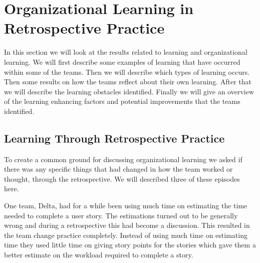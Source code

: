 \begin{table}[!h]
	\begin{center}
	\caption{Value Decreasing Hinders for the Retrospective}
	\label{table:value-decreasing-hinders}
	\end{center}
\end{table}


\clearpage

\section{Organizational Learning in Retrospective Practice}
In this section we will look at the results related to learning and organizational learning. We will first describe some examples of learning that have occurred within some of the teams. Then we will describe which types of learning occurs. Then some results on how the teams reflect about their own learning. After that we will describe the learning obstacles identified. Finally we will give an overview of the learning enhancing factors and potential improvements that the teams identified. 

\subsection{Learning Through Retrospective Practice}
\label{question-11}
To create a common ground for discussing organizational learning we asked if there was any specific things that had changed in how the team worked or thought, through the retrospective. We will described three of these episodes here. 

One team, Delta, had for a while been using much time on estimating the time needed to complete a user story. The estimations turned out to be generally wrong and during a retrospective this had become a discussion. This resulted in the team change practice completely. Instead of using much time on estimating time they used little time on giving story points for the stories which gave them a better estimate on the workload required to complete a story. 

